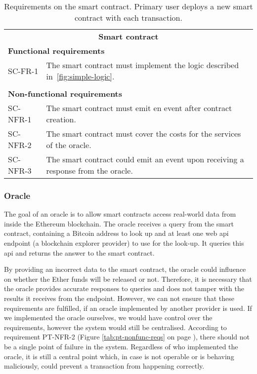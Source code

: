 \begin{table}[ht]
    \centering
    \begin{tabularx}{\textwidth}{|l X|}
    \hline
        \multicolumn{2}{|c|}{\textbf{Smart contract}}\\
        \multicolumn{2}{|l|}{\textbf{Functional requirements}}\\
        SC-FR-1&The smart contract must implement the logic described in~\ref{fig:simple-logic}.\\
        &\\
        \multicolumn{2}{|l|}{\textbf{Non-functional requirements}}\\
        SC-NFR-1&The smart contract must emit en event after contract creation.\\
        SC-NFR-2&The smart contract must cover the costs for the services of the oracle.\\
        SC-NFR-3&The smart contract could emit an event upon receiving a response from the oracle.\\
    \hline
    \end{tabularx}
    \caption{Requirements on the smart contract. Primary user deploys a new smart contract with each transaction.}
    \label{tab:reqs-smart-contract}
\end{table}

\subsubsection{Oracle}
The goal of an oracle is to allow smart contracts access real-world data from inside the Ethereum blockchain. The oracle receives a query from the smart contract, containing a Bitcoin address to look up and at least one web \acrshort{api} endpoint (a blockchain explorer provider) to use for the look-up. It queries this \acrshort{api} and returns the answer to the smart contract.

By providing an incorrect data to the smart contract, the oracle could influence on whether the Ether funds will be released or not. Therefore, it is necessary that the oracle provides accurate responses to queries and does not tamper with the results it receives from the endpoint. However, we can not ensure that these requirements are fulfilled, if an oracle implemented by another provider is used. If we implemented the oracle ourselves, we would have control over the requirements, however the system would still be centralised. According to requirement PT-NFR-2 (Figure \ref{tab:pt-nonfunc-reqs} on page \pageref{tab:pt-nonfunc-reqs}), there should not be a single point of failure in the system. Regardless of who implemented the oracle, it is still a central point which, in case is not operable or is behaving maliciously, could prevent a transaction from happening correctly.

